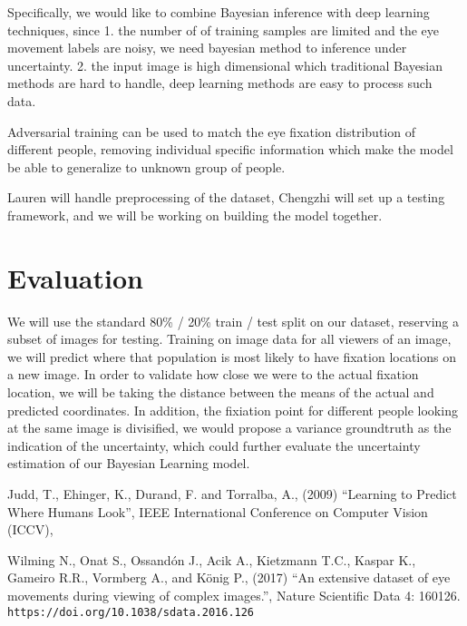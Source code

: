 \documentclass[11pt]{article}
\begin{document}
Specifically, we would like to combine Bayesian inference with deep learning techniques,
since 1. the number of of training samples are limited and the eye movement labels are noisy, we need bayesian method to
inference under uncertainty. 2. the input image is high dimensional which traditional Bayesian methods are hard to handle,
deep learning methods are easy to process such data.

Adversarial training can be used to match the eye fixation distribution of different people, removing
individual specific information which make the model be able to generalize to unknown group of people.

Lauren will handle preprocessing of the dataset, Chengzhi will set up a testing
framework, and we will be working on building the model together. 
\vspace{-0.5cm}

\section{Evaluation}
We will use the standard 80\% / 20\% train / test split on our dataset,
reserving a subset of images for testing. Training on image data for all viewers of
an image, we will predict where that population is most likely to have fixation
locations on a new image. In order to validate how close we were to the actual
fixation location, we will be taking the distance between the means of the
actual and predicted coordinates. In addition, the fixiation point for different 
people looking at the same image is divisified, we would propose a variance groundtruth
as the indication of the uncertainty, which could further evaluate the uncertainty estimation
of our Bayesian Learning model.



\vspace{-0.25cm}


\begin{thebibliography}{99}
      Judd, T., Ehinger, K., Durand, F. and Torralba, A.,
      (2009)
      ``Learning to Predict Where Humans Look'',
      IEEE International Conference on Computer Vision (ICCV),

     Wilming N., Onat S., Ossandón J., Acik A., Kietzmann
    T.C., Kaspar K., Gameiro R.R., Vormberg A., and König P., (2017)
    ``An extensive dataset of eye movements during viewing of complex
    images.'', Nature Scientific Data 4: 160126.  \verb|https://doi.org/10.1038/sdata.2016.126|

\end{thebibliography}
\end{document}
